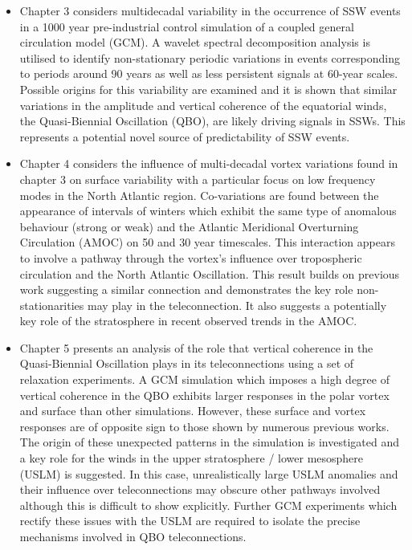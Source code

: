 \begin{itemize}
    \item Chapter 3 considers multidecadal variability in the occurrence of SSW events in a 1000 year pre-industrial control simulation of a coupled general circulation model (GCM). A wavelet spectral decomposition analysis is utilised to identify non-stationary periodic variations in events corresponding to periods around 90 years as well as less persistent signals at 60-year scales. Possible origins for this variability are examined and it is shown that similar variations in the amplitude and vertical coherence of the equatorial winds, the Quasi-Biennial Oscillation (QBO), are likely driving signals in SSWs. This represents a potential novel source of predictability of SSW events.
    
    \item Chapter 4 considers the influence of multi-decadal vortex variations found in chapter 3 on surface variability with a particular focus on low frequency modes in the North Atlantic region. Co-variations are found between the appearance of intervals of winters which exhibit the same type of anomalous behaviour (strong or weak) and the Atlantic Meridional Overturning Circulation (AMOC) on 50 and 30 year timescales. This interaction appears to involve a pathway through the vortex's influence over tropospheric circulation and the North Atlantic Oscillation. This result builds on previous work suggesting a similar connection and demonstrates the key role non-stationarities may play in the teleconnection. It also suggests a potentially key role of the stratosphere in recent observed trends in the AMOC. 
    
    \item Chapter 5 presents an analysis of the role that vertical coherence in the Quasi-Biennial Oscillation plays in its teleconnections using a set of relaxation experiments. A GCM simulation which imposes a high degree of vertical coherence in the QBO exhibits larger responses in the polar vortex and surface than other simulations. However, these surface and vortex responses are of opposite sign to those shown by numerous previous works. The origin of these unexpected patterns in the simulation is investigated and a key role for the winds in the upper stratosphere / lower mesosphere (USLM) is suggested. In this case, unrealistically large USLM anomalies and their influence over teleconnections may obscure other pathways involved although this is difficult to show explicitly. Further GCM experiments which rectify these issues with the USLM are required to isolate the precise mechanisms involved in QBO teleconnections.  
\end{itemize}

